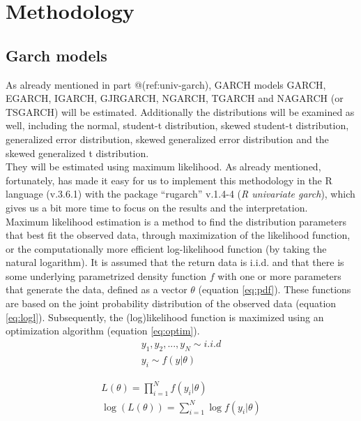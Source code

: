\documentclass[a4paper, twoside]{templates/ociamthesis}
\begin{document}
\clearpage

\hypertarget{methodology}{%
\section{Methodology}\label{methodology}}

\hypertarget{garch-models}{%
\subsection{Garch models}\label{garch-models}}

As already mentioned in part @(ref:univ-garch), GARCH models GARCH, EGARCH, IGARCH, GJRGARCH, NGARCH, TGARCH and NAGARCH (or TSGARCH) will be estimated. Additionally the distributions will be examined as well, including the normal, student-t distribution, skewed student-t distribution, generalized error distribution, skewed generalized error distribution and the skewed generalized t distribution. ~\\

They will be estimated using maximum likelihood. As already mentioned, fortunately, \textcite{alexios2020} has made it easy for us to implement this methodology in the R language (v.3.6.1) with the package ``rugarch'' v.1.4-4 (\emph{R univariate garch}), which gives us a bit more time to focus on the results and the interpretation.~\\

Maximum likelihood estimation is a method to find the distribution parameters that best fit the observed data, through maximization of the likelihood function, or the computationally more efficient log-likelihood function (by taking the natural logarithm). It is assumed that the return data is i.i.d. and that there is some underlying parametrized density function \(f\) with one or more parameters that generate the data, defined as a vector \(\theta\) (equation \eqref{eq:pdf}). These functions are based on the joint probability distribution of the observed data (equation \eqref{eq:logl}). Subsequently, the (log)likelihood function is maximized using an optimization algorithm (equation \eqref{eq:optim}).~\\

\begin{align} 
  y_1,y_2,...,y_N \sim i.i.d
    \\
  y_i \sim f(y|\theta)
 \label{eq:pdf}
\end{align}

\begin{align} 
 L(\theta) = \prod^N_{i=1}f(y_i|\theta)
  \\
 \log(L(\theta)) = \sum^N_{i=1} \log f(y_i |\theta)
 \label{eq:logl}
\end{align}
\end{document}
